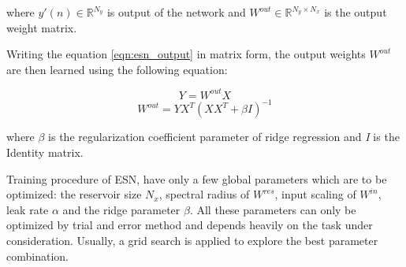 where $y'(n) \in \mathbb{R}^{N_y}$ is output of the network and $W^{out} \in \mathbb{R}^{{N_y} \times {N_x}}$ is the output weight matrix.

Writing the equation \ref{eqn:esn_output} in matrix form, the output weights $W^{out}$ are then learned using the following equation:
 
\begin{equation}
Y=W^{out}X
\end{equation}
\begin{equation}
W^{out}=YX^{T}(XX^{T}+{\beta}I)^{-1}
\end{equation}

where $\beta$ is the regularization coefficient parameter of ridge regression and \textit{I} is the Identity matrix. 

Training procedure of ESN, have only a few global parameters which are to be optimized: the reservoir size $ N_{x} $, spectral radius of $W^{res}$, input scaling of $W^{in}$, leak rate $\alpha$ and the ridge parameter $\beta$. All these parameters can only be optimized by trial and error method and depends heavily on the task under consideration. Usually, a grid search is applied to explore the best parameter combination.     
